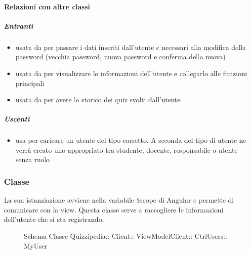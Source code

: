 \paragraph{Relazioni con altre classi}
\subparagraph{Entranti}
\begin{itemize}
\item usata da  per passare i dati inseriti dall'utente e necessari alla modifica della password (vecchia password, nuova password e conferma della nuova)
\item usata da  per visualizzare le informazioni dell'utente e collegarlo alle funzioni principali
\item usata da  per avere lo storico dei quiz svolti dall'utente
\end{itemize}
\subparagraph{Uscenti}
\begin{itemize}
\item usa  per caricare un utente del tipo corretto. A seconda del tipo di utente ne verrà creato uno appropriato tra studente, docente, responsabile o utente senza ruolo
\end{itemize}
\subsubsection{Classe }
La sua istanziazione avviene nella variabile \$scope di Angular e permette di comunicare con la view. Questa classe serve a raccogliere le informazioni dell'utente che si sta registrando.
\begin{figure}[H]
\centering
\noindent{}
\caption[Schema Classe MyUser]{Schema Classe Quizzipedia:: Client:: ViewModelClient:: CtrlUsers:: MyUser}
\end{figure}
